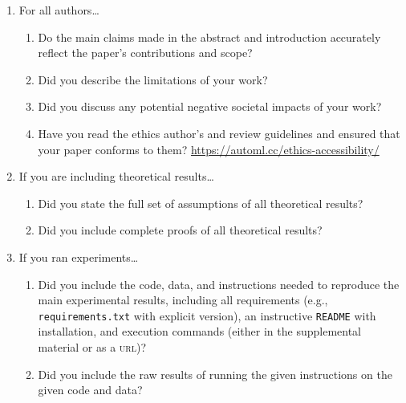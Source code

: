 \documentclass[11pt]{article}
\begin{document}
\begin{enumerate}
\item For all authors\dots
  \begin{enumerate}
  \item Do the main claims made in the abstract and introduction accurately
    reflect the paper's contributions and scope?
  \item Did you describe the limitations of your work?
  \item Did you discuss any potential negative societal impacts of your work?
  \item Have you read the ethics author's and review guidelines and ensured that your paper
    conforms to them? \url{https://automl.cc/ethics-accessibility/}
  \end{enumerate}
\item If you are including theoretical results\dots
  \begin{enumerate}
  \item Did you state the full set of assumptions of all theoretical results?
  \item Did you include complete proofs of all theoretical results?
  \end{enumerate}
\item If you ran experiments\dots
  \begin{enumerate}
  \item Did you include the code, data, and instructions needed to reproduce the
    main experimental results, including all requirements (e.g.,
    \texttt{requirements.txt} with explicit version), an instructive
    \texttt{README} with installation, and execution commands (either in the
    supplemental material or as a \textsc{url})?
  \item Did you include the raw results of running the given instructions on the given code and data?

\end{enumerate}
\end{enumerate}
\end{document}

